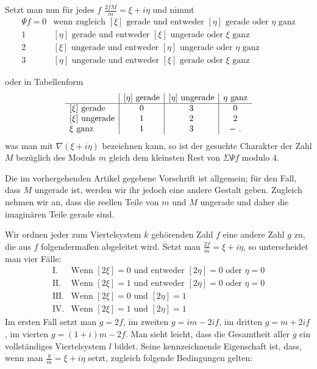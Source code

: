 Setzt man nun für jedes $f$ $\frac{2fM}{m}=\xi+i\eta$ und nimmt
\begingroup\small\setlength{\arraycolsep}{2pt}
\[
\begin{array}{rl}
\Psi f=0&\text{wenn zugleich }[\xi]\text{ gerade und entweder }[\eta]\text{ gerade oder }\eta\text{ ganz}\\
1&[\eta]\text{ gerade und entweder }[\xi]\text{ ungerade oder }\xi\text{ ganz}\\
2&[\xi]\text{ ungerade und entweder }[\eta]\text{ ungerade oder }\eta\text{ ganz}\\
3&[\eta]\text{ ungerade und entweder }[\xi]\text{ gerade oder }\xi\text{ ganz}
\end{array}
\]
\endgroup

oder in Tabellenform
\[
\begin{array}{l|c|c|c}
&[\eta]\text{ gerade}&[\eta]\text{ ungerade}&\eta\text{ ganz}\\\hline
[\xi]\text{ gerade}&0&3&0\\
\relax[\xi]\text{ ungerade}&1&2&2\\
\xi\text{ ganz}&1&3&-\ \mathbin{.}
\end{array}
\]
was man mit $\nabla(\xi+i\eta)$ bezeichnen kann, so ist der gesuchte Charakter der Zahl $M$ bezüglich des Moduls $m$ gleich dem kleinsten Rest von $\Sigma\Psi f$ modulo $4$.


Die im vorhergehenden Artikel gegebene Vorschrift ist allgemein; für den Fall, dass $M$ ungerade ist, werden wir ihr jedoch eine andere Gestalt geben. Zugleich nehmen wir an, dass die reellen Teile von $m$ und $M$ ungerade und daher die imaginären Teile gerade sind.

Wir ordnen jeder zum Viertelsystem $k$ gehörenden Zahl $f$ eine andere Zahl $g$ zu, die aus $f$ folgendermaßen abgeleitet wird. Setzt man $\frac{2f}{m}=\xi+i\eta$, so unterscheidet man vier Fälle:
\[
\begin{array}{ll}
\mathrm{I.}&\text{Wenn }[2\xi]=0\text{ und entweder }[2\eta]=0\text{ oder }\eta=0\\
\mathrm{II.}&\text{Wenn }[2\xi]=1\text{ und entweder }[2\eta]=0\text{ oder }\eta=0\\
\mathrm{III.}&\text{Wenn }[2\xi]=0\text{ und }[2\eta]=1\\
\mathrm{IV.}&\text{Wenn }[2\xi]=1\text{ und }[2\eta]=1
\end{array}
\]
Im ersten Fall setzt man $g=2f$, im zweiten $g=im-2if$, im dritten $g=m+2if$, im vierten $g=(1+i)m-2f$. Man sieht leicht, dass die Gesamtheit aller $g$ ein vollständiges Viertelsystem $l$ bildet. Seine kennzeichnende Eigenschaft ist, dass, wenn man $\frac gm=\xi+i\eta$ setzt, zugleich folgende Bedingungen gelten:

